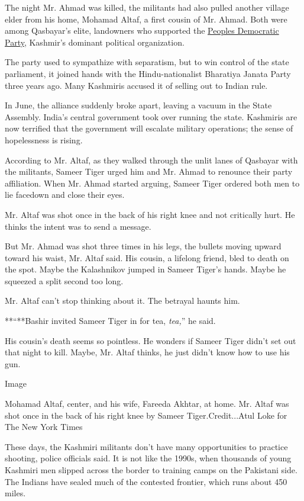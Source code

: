 The night Mr. Ahmad was killed, the militants had also pulled another
village elder from his home, Mohamad Altaf, a first cousin of Mr. Ahmad.
Both were among Qasbayar's elite, landowners who supported the
\href{https://economictimes.indiatimes.com/news/politics-and-nation/jks-pdp-bjp-alliance-becoming-increasingly-untenable/articleshow/62897945.cms}{Peoples
Democratic Party}, Kashmir's dominant political organization.

The party used to sympathize with separatism, but to win control of the
state parliament, it joined hands with the Hindu-nationalist Bharatiya
Janata Party three years ago. Many Kashmiris accused it of selling out
to Indian rule.

In June, the alliance suddenly broke apart, leaving a vacuum in the
State Assembly. India's central government took over running the state.
Kashmiris are now terrified that the government will escalate military
operations; the sense of hopelessness is rising.

According to Mr. Altaf, as they walked through the unlit lanes of
Qasbayar with the militants, Sameer Tiger urged him and Mr. Ahmad to
renounce their party affiliation. When Mr. Ahmad started arguing, Sameer
Tiger ordered both men to lie facedown and close their eyes.

Mr. Altaf was shot once in the back of his right knee and not critically
hurt. He thinks the intent was to send a message.

But Mr. Ahmad was shot three times in his legs, the bullets moving
upward toward his waist, Mr. Altaf said. His cousin, a lifelong friend,
bled to death on the spot. Maybe the Kalashnikov jumped in Sameer
Tiger's hands. Maybe he squeezed a split second too long.

Mr. Altaf can't stop thinking about it. The betrayal haunts him.

**``**Bashir invited Sameer Tiger in for tea, \emph{tea,}'' he said.

His cousin's death seems so pointless. He wonders if Sameer Tiger didn't
set out that night to kill. Maybe, Mr. Altaf thinks, he just didn't know
how to use his gun.

Image

Mohamad Altaf, center, and his wife, Fareeda Akhtar, at home. Mr. Altaf
was shot once in the back of his right knee by Sameer
Tiger.Credit...Atul Loke for The New York Times

These days, the Kashmiri militants don't have many opportunities to
practice shooting, police officials said. It is not like the 1990s, when
thousands of young Kashmiri men slipped across the border to training
camps on the Pakistani side. The Indians have sealed much of the
contested frontier, which runs about 450 miles.

